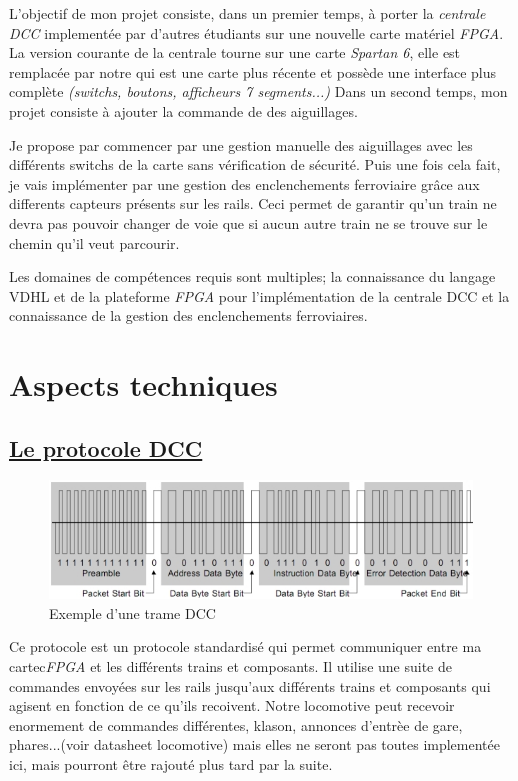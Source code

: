 L'objectif de mon projet consiste, dans un premier temps, à porter la
\emph{centrale DCC} implement\'ee par d'autres \'etudiants sur une nouvelle
carte mat\'eriel \emph{FPGA}. La version courante de la centrale tourne sur
une carte \emph{Spartan 6}, elle est remplac\'ee par notre \crt qui est
une carte plus r\'ecente et possède une interface plus complète
\emph{(switchs, boutons, afficheurs 7 segments...)}
Dans un second temps, mon projet consiste à ajouter la commande de
des aiguillages.

Je propose par commencer par une gestion manuelle des aiguillages avec
les diff\'erents switchs de la carte sans v\'erification de s\'ecurit\'e. Puis
une fois cela fait, je vais impl\'ementer par une gestion des
enclenchements ferroviaire grâce aux differents capteurs pr\'esents sur
les rails. Ceci permet de garantir qu'un train ne devra pas pouvoir
changer de voie que si aucun autre train ne se trouve sur le chemin
qu'il veut parcourir. 

Les domaines de comp\'etences requis sont multiples; la connaissance
du langage VDHL et de la plateforme \emph{FPGA} pour l'impl\'ementation
de la centrale DCC et la connaissance de la gestion des enclenchements
ferroviaires.


\newpage
\section{Aspects techniques}
\label{sec:asp_tech}

\subsection{\underline{ Le protocole DCC}}
\label{sec:dcc}


\begin{figure}[ht]
\centering
\includegraphics[scale=0.75]{trame.png}
\caption{Exemple d'une trame DCC}
\label{fig1}
\end{figure}


Ce protocole est un protocole standardis\'e qui permet communiquer
entre ma cartec\emph{FPGA} et les diff\'erents trains et
composants. Il utilise une suite de commandes envoy\'ees sur les rails
jusqu'aux diff\'erents trains et composants qui agisent en fonction de
ce qu'ils recoivent.
Notre locomotive peut recevoir enormement de commandes différentes,
klason, annonces d'entr\`ee de gare, phares...(voir datasheet
locomotive) mais elles ne seront pas toutes implement\'ee ici, mais
pourront \^etre rajout\'e plus tard par la suite. 

